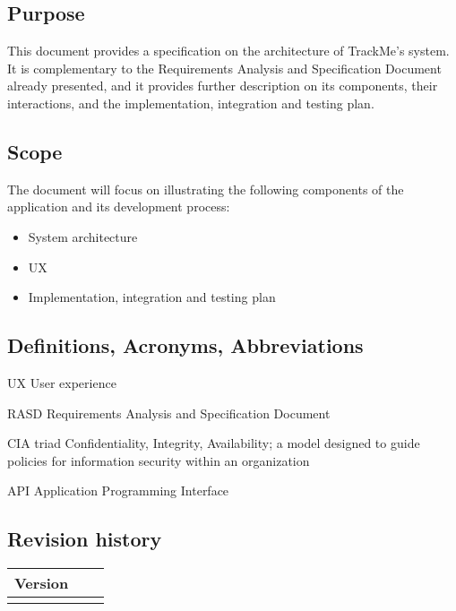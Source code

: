 \documentclass[../main.tex]{subfiles}
\begin{document}
\subsection{Purpose}

This document provides a specification on the architecture of TrackMe's system. It is complementary to the Requirements Analysis and Specification Document already presented, and it provides further description on its components, their interactions, and the implementation, integration and testing plan.

\subsection{Scope}

The document will focus on illustrating the following components of the application and its development process:

\begin{itemize}

	\item{System architecture} 
	\item{UX} 
	\item{Implementation, integration and testing plan} 

\end{itemize}

\subsection{Definitions, Acronyms, Abbreviations}
\begin{description}
	\item{UX} User experience
	\item {RASD} Requirements Analysis and Specification Document
	\item {CIA triad} Confidentiality, Integrity, Availability; a model designed to guide policies for information security within an organization
	\item {API} Application Programming Interface
\end{description}

\subsection{Revision history}
\begin{tabular}{p{1.2cm}|p{2.1cm}|p{2.6cm}}
	\bf Version & \bf \makebox[2.1cm][c]{Release Date} & \bf \makebox[3cm][c]{Description} \\
	\hline
	\makebox[1.2cm][c]{1.0} & \makebox[2.1cm][c]{10/12/2018} & \makebox[3cm][c]{Initial Release}\\
\end{tabular}
\end{document}
